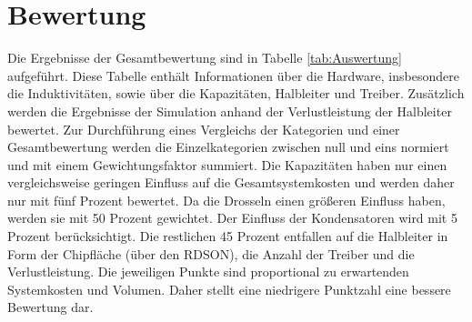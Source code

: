 \section{Bewertung}
Die Ergebnisse der Gesamtbewertung sind in Tabelle \ref{tab:Auswertung} aufgeführt. Diese Tabelle enthält Informationen über die Hardware, insbesondere die Induktivitäten, sowie über die Kapazitäten, Halbleiter und Treiber. Zusätzlich werden die Ergebnisse der Simulation anhand der Verlustleistung der Halbleiter bewertet.  Zur Durchführung eines Vergleichs der Kategorien und einer Gesamtbewertung werden die Einzelkategorien zwischen null und eins normiert und mit einem Gewichtungsfaktor summiert. Die Kapazitäten haben nur einen vergleichsweise geringen Einfluss auf die Gesamtsystemkosten und werden daher nur mit fünf Prozent bewertet. Da die Drosseln einen größeren Einfluss haben, werden sie mit 50 Prozent gewichtet. Der Einfluss der Kondensatoren wird mit 5 Prozent berücksichtigt. Die restlichen 45 Prozent entfallen auf die Halbleiter in Form der Chipfläche (über den RDSON), die Anzahl der Treiber und die Verlustleistung. Die jeweiligen Punkte sind proportional zu erwartenden Systemkosten und Volumen. Daher stellt eine niedrigere Punktzahl eine bessere Bewertung dar. \\
